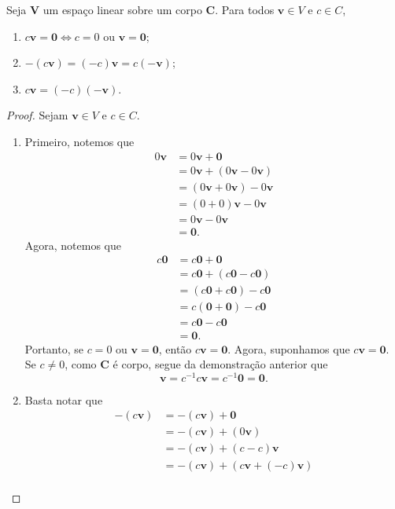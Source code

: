 \begin{proposition}
Seja $\bm V$ um espaço linear sobre um corpo $\bm C$. Para todos $\bm v \in V$ e $c \in C$,
	\begin{enumerate}
	\item $c\bm v = \bm 0 \Leftrightarrow c=0 \text{\ \ ou\ \ } \bm v = \bm 0$;
	\item $-(c\bm v) = (-c)\bm v = c(- \bm v)$;
	\item $c\bm v = (-c)(- \bm v)$.
	\end{enumerate}
\end{proposition}
\begin{proof} Sejam $\bm v \in V$ e $c \in C$.
	\begin{enumerate}
	\item Primeiro, notemos que
		\begin{align*}
		0 \bm v &= 0 \bm v + \bm 0 \\
			&= 0 \bm v + (0 \bm v - 0 \bm v) \\
			&= (0 \bm v + 0 \bm v) - 0 \bm v \\
			&= (0+0) \bm v - 0 \bm v \\
			&= 0 \bm v - 0 \bm v \\
			&= \bm 0.
		  \end{align*}
Agora, notemos que
		\begin{align*}
		c \bm 0 &= c \bm 0 + \bm 0 \\
			&= c \bm 0 + (c \bm 0 - c \bm 0) \\
			&= (c \bm 0 + c \bm 0) - c \bm 0 \\
			&= c  (\bm 0 + \bm 0) - c \bm 0 \\
			&= c \bm 0 - c \bm 0 \\
			&= \bm 0.
		\end{align*}
Portanto, se $c=0$ ou $\bm v = \bm 0$, então $c\bm v = \bm 0$. Agora, suponhamos que $c\bm v =\bm 0$. Se $c \neq 0$, como $\bm C$ é corpo, segue da demonstração anterior que
		\begin{equation*}
		\bm v = c^{-1}c\bm v = c^{-1} \bm 0 = \bm 0.
		\end{equation*}
	\item Basta notar que
		\begin{align*}
		\bm -(c\bm{v}) &= \bm -(c\bm{v}) + \bm 0 \\
			&= \bm -(c\bm{v}) + (0 \bm v) \\
			&= \bm -(c\bm{v}) + (c-c) \bm v \\
			&= \bm -(c\bm{v}) + (c\bm v + (-c) \bm v) \\

\end{align*}
\end{enumerate}
\end{proof}

